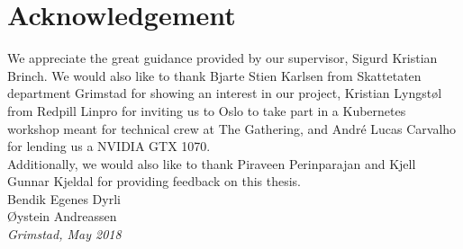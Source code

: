\documentclass[../main.tex]{subfiles}
\begin{document}
\chapter*{Acknowledgement}
We appreciate the great guidance provided by our supervisor, Sigurd Kristian Brinch. We would also like to thank Bjarte Stien Karlsen from Skattetaten department Grimstad for showing an interest in our project, Kristian Lyngstøl from Redpill Linpro  for inviting us to Oslo to take part in a Kubernetes workshop meant for technical crew at The Gathering, and André Lucas Carvalho for lending us a NVIDIA GTX 1070. \\

\noindent Additionally, we would also like to thank Piraveen Perinparajan and Kjell Gunnar Kjeldal for providing feedback on this thesis. \\


\noindent Bendik Egenes Dyrli \\
Øystein Andreassen \\

\emph{Grimstad, May 2018}
\end{document}
